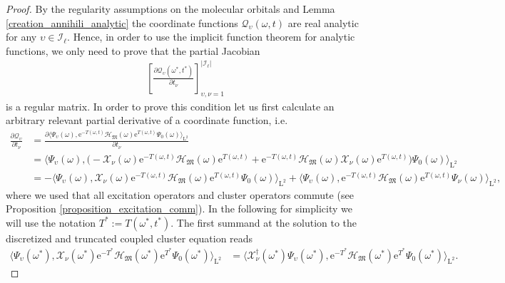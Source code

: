 \documentclass[reqno]{amsart}
\begin{document}
\begin{proof}
    By the regularity assumptions on the molecular orbitals and Lemma \ref{creation_annihili_analytic} the  coordinate functions $\mathcal{Q}_\upsilon(\omega,t)$ are real analytic for any $\upsilon\in \mathscr{I}_\ell$. Hence, in order to use the implicit function theorem for analytic functions, we only need to prove that the partial Jacobian 
    \begin{align}\label{jacobian_Q}
        \left[ \frac{\partial \mathcal{Q}_\upsilon (\omega^*,t^*)}{\partial t_\nu}\right]_{\upsilon,\nu=1}^{|\mathscr{I}_\ell|}
    \end{align}
    is a regular matrix. In order to prove this condition let us first calculate an arbitrary relevant partial derivative of a coordinate function, i.e.
    \begin{align*}
        \frac{\partial \mathcal{Q}_\upsilon }{\partial t_\nu}&= \frac{\partial \langle \Psi_\upsilon(\omega),\mathrm{e}^{-T(\omega,t)}\mathcal{H}_\mathfrak{M}(\omega)\mathrm{e}^{T(\omega,t)}\Psi_0(\omega)\rangle_{\mathrm{L}^2} }{\partial t_\nu}\\
        &=\big\langle \Psi_\upsilon(\omega),\big(-\mathscr{X}_\nu(\omega)\mathrm{e}^{-T(\omega,t)}\mathcal{H}_\mathfrak{M}(\omega)\mathrm{e}^{T(\omega,t)}+\mathrm{e}^{-T(\omega,t)}\mathcal{H}_\mathfrak{M}(\omega)\mathscr{X}_\nu(\omega)\mathrm{e}^{T(\omega,t)}\big)\Psi_0(\omega)\big\rangle_{\mathrm{L}^2}\\
        &=-\big\langle \Psi_\upsilon(\omega),\mathscr{X}_\nu(\omega)\mathrm{e}^{-T(\omega,t)}\mathcal{H}_\mathfrak{M}(\omega)\mathrm{e}^{T(\omega,t)}\Psi_0(\omega)\big\rangle_{\mathrm{L}^2}+\big\langle \Psi_\upsilon(\omega),\mathrm{e}^{-T(\omega,t)}\mathcal{H}_\mathfrak{M}(\omega)\mathrm{e}^{T(\omega,t)}\Psi_\nu(\omega)\big\rangle_{\mathrm{L}^2},        \end{align*}
        where we used that all excitation operators and cluster operators commute (see Proposition \ref{proposition_excitation_comm}). In the following for simplicity we will use the notation $T^*:=T(\omega^*,t^*)$. The first summand at the solution to the discretized and truncated coupled cluster equation reads
    \begin{align*}
        \langle \Psi_\upsilon(\omega^*),\mathscr{X}_\nu(\omega^*)\mathrm{e}^{-T^*}\mathcal{H}_\mathfrak{M}(\omega^*)\mathrm{e}^{T^*}\Psi_0(\omega^*)\rangle_{\mathrm{L}^2}&=\langle \mathscr{X}^{\dagger}_\nu(\omega^*)\Psi_\upsilon(\omega^*),\mathrm{e}^{-T^*}\mathcal{H}_\mathfrak{M}(\omega^*)\mathrm{e}^{T^*}\Psi_0(\omega^*)\rangle_{\mathrm{L}^2}.

\end{align*}
\end{proof}
\end{document}
